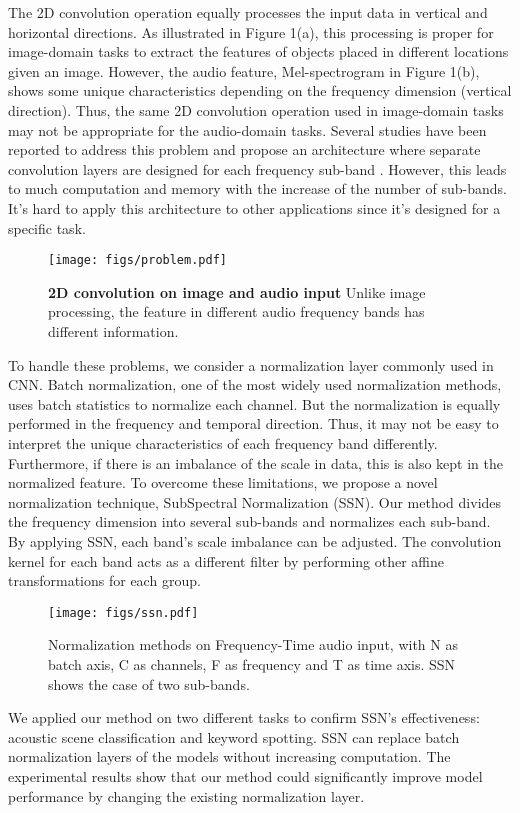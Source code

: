 \documentclass{article}
\begin{document}
The 2D convolution operation equally processes the input data in vertical and horizontal directions. As illustrated in Figure 1(a), this processing is proper for image-domain tasks to extract the features of objects placed in different locations given an image. However, the audio feature, Mel-spectrogram in Figure 1(b), shows some unique characteristics depending on the frequency dimension (vertical direction). Thus, the same 2D convolution operation used in image-domain tasks may not be
appropriate for the audio-domain tasks. Several studies have been reported to address this problem and propose an architecture where separate convolution layers are designed for each frequency sub-band \cite{phaye2019subspectralnet, mcdonnell2020acoustic, kao2019sub}. However, this leads to much computation and memory with the increase of the number of sub-bands. 
It's hard to apply this architecture to other applications since it's designed for a specific task.




\begin{figure}[t]
\centering
\texttt{[image: figs/problem.pdf]}
\vskip -0.07in
\caption{\textbf{2D convolution on image and audio input} Unlike image processing, the feature in different audio frequency bands has different information.}
\label{fig:problem}
\end{figure}

To handle these problems, we consider a normalization layer commonly used in CNN. Batch normalization, one of the most widely used normalization methods, uses batch statistics to normalize each channel. 
But the normalization is equally performed in the frequency and temporal direction. Thus, it may not be easy to interpret the unique characteristics of each frequency band differently. Furthermore, if there is an imbalance of the scale in data, this is also kept in the normalized feature. To overcome these limitations, we propose a novel normalization technique, SubSpectral Normalization (SSN). Our method divides the frequency dimension into several sub-bands and normalizes each sub-band. By applying SSN, each band's scale imbalance can be adjusted. The convolution kernel for each band acts as a different filter by performing other affine transformations for each group.

\begin{figure*}[t]
\centering
\texttt{[image: figs/ssn.pdf]}
\vskip -0.05in
\caption{Normalization methods on Frequency-Time audio input, with N as batch axis, C as channels, F as frequency and T as time axis. SSN shows the case of two sub-bands.}
\label{fig:ssn}
\end{figure*}
We applied our method on two different tasks to confirm SSN's effectiveness: acoustic scene classification and keyword spotting. SSN can replace batch normalization layers of the models without increasing computation. The experimental results show that our method could significantly improve model performance by changing the existing normalization layer.
\end{document}
